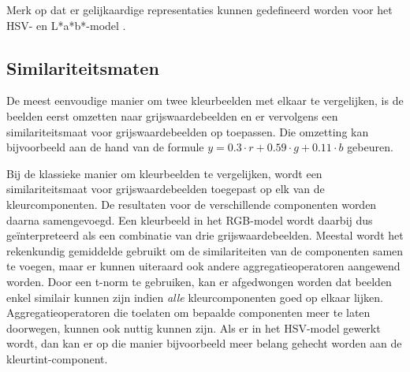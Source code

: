 Merk op dat er gelijkaardige representaties kunnen gedefineerd worden voor het HSV- en L*a*b*-model
\cite{vanderweken:construction_of_quality_measures}.

\subsection{Similariteitsmaten}
\label{sectie:kleurbeelden_similariteitsmaten}

De meest eenvoudige manier om twee kleurbeelden met elkaar te vergelijken, is de beelden eerst omzetten naar 
grijswaardebeelden en er vervolgens een similariteitsmaat voor grijswaardebeelden op toepassen. Die omzetting 
kan bijvoorbeeld aan de hand van de formule $y = 0.3 \cdot r + 0.59 \cdot g + 0.11 \cdot b$ 
\cite{debaets:similariteitsmaten_voor_kleurbeelden} gebeuren.

Bij de klassieke manier om kleurbeelden te vergelijken, wordt een similariteitsmaat 
voor grijswaardebeelden toegepast op elk van de kleurcomponenten. De resultaten voor de
verschillende componenten worden daarna samengevoegd. Een kleurbeeld in het RGB-model wordt daarbij
dus ge\"interpreteerd als een combinatie van drie grijswaardebeelden. Meestal wordt
het rekenkundig gemiddelde gebruikt om de similariteiten van de componenten samen te voegen,
maar er kunnen uiteraard ook andere aggregatieoperatoren aangewend worden. Door een t-norm
te gebruiken, kan er afgedwongen worden dat beelden enkel similair kunnen
zijn indien \emph{alle} kleurcomponenten goed op elkaar lijken. Aggregatieoperatoren
die toelaten om bepaalde componenten meer te laten doorwegen, kunnen ook nuttig
kunnen zijn. Als er in het HSV-model gewerkt wordt, dan kan er op die manier 
bijvoorbeeld meer belang gehecht worden aan de kleurtint-component.


